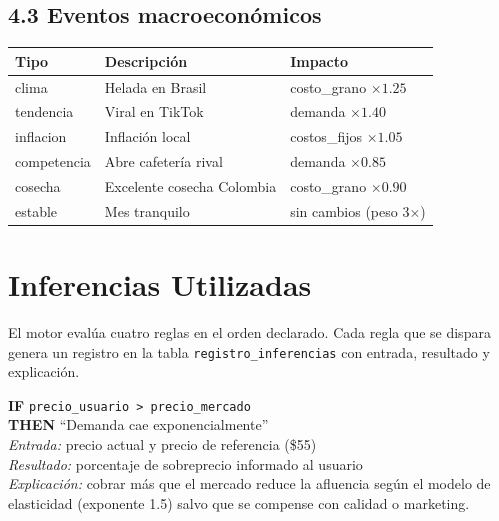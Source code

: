 \documentclass[12pt,spanish]{article}
\begin{document}
\subsection*{4.3 Eventos macroeconómicos}

\begin{center}
\begin{tabular}{lll}
  \toprule
  Tipo & Descripción & Impacto \\
  \midrule
  clima & Helada en Brasil & costo\_grano $\times 1.25$ \\
  tendencia & Viral en TikTok & demanda $\times 1.40$ \\
  inflacion & Inflación local & costos\_fijos $\times 1.05$ \\
  competencia & Abre cafetería rival & demanda $\times 0.85$ \\
  cosecha & Excelente cosecha Colombia & costo\_grano $\times 0.90$ \\
  estable & Mes tranquilo & sin cambios (peso 3$\times$) \\
  \bottomrule
\end{tabular}
\end{center}

\section{Inferencias Utilizadas}

El motor evalúa cuatro reglas en el orden declarado.
Cada regla que se dispara genera un registro en la tabla
\texttt{registro\_inferencias} con entrada, resultado y explicación.

\begin{tcolorbox}[
  title={Regla 1 — Precio alto}, colframe=rojo, colback=rojo!6,
  fonttitle=\bfseries, breakable
]
\textbf{IF} \texttt{precio\_usuario > precio\_mercado}\\
\textbf{THEN} ``Demanda cae exponencialmente''\\[4pt]
\textit{Entrada:} precio actual y precio de referencia (\$55)\\
\textit{Resultado:} porcentaje de sobreprecio informado al usuario\\
\textit{Explicación:} cobrar más que el mercado reduce la afluencia
                      según el modelo de elasticidad (exponente 1.5)
                      salvo que se compense con calidad o marketing.
\end{tcolorbox}
\end{document}
